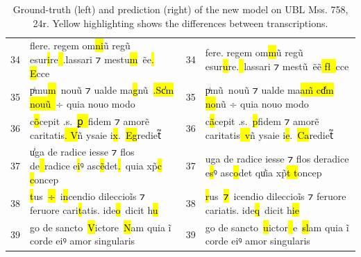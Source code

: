 \documentclass{article}
\begin{document}
\begin{table}[H]
{{\begin{tabular}{rl|rl}
            34 & f\hl{l}ere. regem om\hl{ni}ũ regũ esur\hl{i}re\hl{~}.lassari ⁊ mestu\hl{m}~ẽe\hl{. E}cce & 34 & fere. regem om\hl{m}ũ regũ esur\hl{u}re.\hl{~}lassari ⁊ mestu\hl{̃}~ẽe\hl{̃ fł~}cce \\
            35 & pͥmu\hl{m}~nouũ ⁊ ualde ma\hl{g}nũ~\hl{.Sc̾m nouũ~}÷ quia nouo modo & 35 & pͥmu\hl{̃}~nouũ ⁊ ualde ma\hl{am̃ cd̾m no}nũ ÷ quia nouo modo \\
            36 & c\hl{o}̃cepit .s.~\hl{ꝑ~}fidem ⁊ amorẽ caritatis\hl{. V}ñ ysaie i\hl{x}.~\hl{Eg}rediet᷑ & 36 & c\hl{a}̃cepit .s.~\hl{p}fidem ⁊ amorẽ caritatis\hl{~v}ñ ysaie i\hl{e}.~\hl{Ca}rediet᷑ \\
            37 & u\hl{̾}ga de radice iesse ⁊ flos de\hl{~}radice e\hl{i}ꝰ asc\hl{ẽ}det\hl{.}~quia xp̃\hl{c c}oncep & 37 & uga de radice iesse ⁊ flos deradice e\hl{s}ꝰ asc\hl{o}det qu\hl{̾}ia xp̃\hl{t t}oncep \\
            38 & \hl{t}us~\hl{÷}~i\hl{n}cendio dileccioĩs ⁊ feruore cari\hl{t}atis. ide\hl{o}~dicit h\hl{u} & 38 & \hl{r}us~\hl{⁊}~icendio dileccioĩs ⁊ feruore cariatis. ide\hl{q}~dicit h\hl{ie} \\
            39 & go de sancto~\hl{V}ictore~\hl{N}am quia ĩ corde eiꝰ amor singularis & 39 & go de sancto~\hl{u}ictor\hl{~}e~\hl{sl}am quia ĩ corde eiꝰ amor singularis \\
\end{tabular}
}}
\caption{Ground-truth (left) and prediction (right) of the new model on UBL Mss. 758, 24r. Yellow highlighting shows the differences between transcriptions.}
\label{tab:diff-gt}
\end{table}
\end{document}
